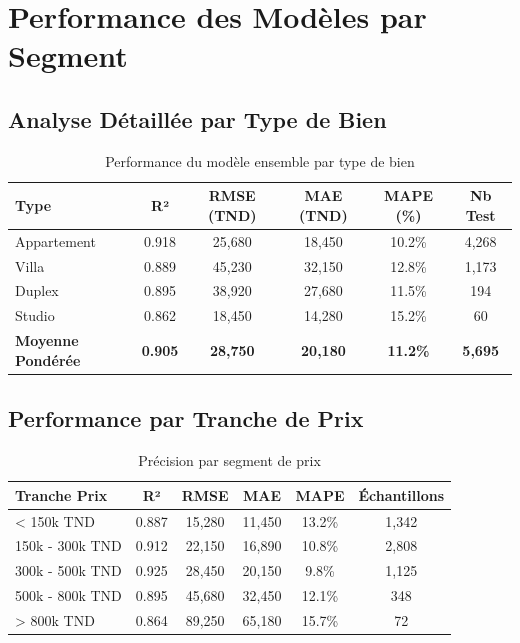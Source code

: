 \section{Performance des Modèles par Segment}

\subsection{Analyse Détaillée par Type de Bien}

\begin{table}[H]
\centering
\caption{Performance du modèle ensemble par type de bien}
\begin{tabular}{|l|c|c|c|c|c|}
\hline
\textbf{Type} & \textbf{R²} & \textbf{RMSE (TND)} & \textbf{MAE (TND)} & \textbf{MAPE (\%)} & \textbf{Nb Test} \\
\hline
Appartement & 0.918 & 25,680 & 18,450 & 10.2\% & 4,268 \\
Villa & 0.889 & 45,230 & 32,150 & 12.8\% & 1,173 \\
Duplex & 0.895 & 38,920 & 27,680 & 11.5\% & 194 \\
Studio & 0.862 & 18,450 & 14,280 & 15.2\% & 60 \\
\hline
\textbf{Moyenne Pondérée} & \textbf{0.905} & \textbf{28,750} & \textbf{20,180} & \textbf{11.2\%} & \textbf{5,695} \\
\hline
\end{tabular}
\end{table}

\subsection{Performance par Tranche de Prix}

\begin{table}[H]
\centering
\caption{Précision par segment de prix}
\begin{tabular}{|l|c|c|c|c|c|}
\hline
\textbf{Tranche Prix} & \textbf{R²} & \textbf{RMSE} & \textbf{MAE} & \textbf{MAPE} & \textbf{Échantillons} \\
\hline
< 150k TND & 0.887 & 15,280 & 11,450 & 13.2\% & 1,342 \\
150k - 300k TND & 0.912 & 22,150 & 16,890 & 10.8\% & 2,808 \\
300k - 500k TND & 0.925 & 28,450 & 20,150 & 9.8\% & 1,125 \\
500k - 800k TND & 0.895 & 45,680 & 32,450 & 12.1\% & 348 \\
> 800k TND & 0.864 & 89,250 & 65,180 & 15.7\% & 72 \\
\hline
\end{tabular}
\end{table}

